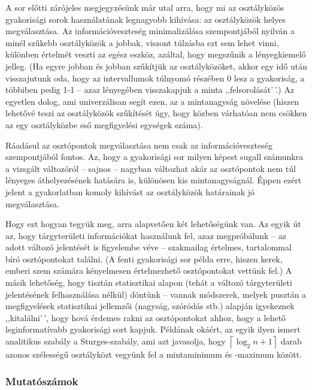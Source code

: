 \documentclass[
]{book}
\begin{document}
A sor előtti zárójeles megjegyzésünk már utal arra, hogy mi az osztályközös gyakorisági sorok használatának legnagyobb kihívása: az osztályközök helyes megválasztása. Az információveszteség minimalizálása szempontjából nyilván a minél szűkebb osztályközök a jobbak, viszont túlzásba ezt sem lehet vinni, különben értelmét veszti az egész eszköz, azáltal, hogy megszűnik a lényegkiemelő jelleg. (Ha egyre jobban és jobban szűkítjük az osztályközöket, akkor egy idő után visszajutunk oda, hogy az intervallumok túlnyomó részében 0 lesz a gyakoriság, a többiben pedig 1-1 -- azaz lényegében visszakapjuk a minta ,,felsorolását'\,'.) Az egyetlen dolog, ami univerzálisan segít ezen, az a mintanagyság növelése (hiszen lehetővé teszi az osztályközök szűkítését úgy, hogy közben várhatóan nem csökken az egy osztályközbe eső megfigyelési egységek száma).

Ráadásul az osztópontok megválasztása nem csak az információveszteség szempontjából fontos. Az, hogy a gyakorisági sor milyen képest sugall számunkra a vizsgált változóról -- sajnos -- nagyban változhat akár az osztópontok nem túl lényeges áthelyezésének hatására is, különösen kis mintanagyságnál. Éppen ezért jelent a gyakorlatban komoly kihívást az osztályközök határainak jó megválasztása.

Hogy ezt hogyan tegyük meg, arra alapvetően két lehetőségünk van. Az egyik út az, hogy tárgyterületi információkat használunk fel, azaz megpróbálunk -- az adott változó jelentését is figyelembe véve -- szakmailag értelmes, tartalommal bíró osztópontokat találni. (A fenti gyakorisági sor példa erre, hiszen kerek, emberi szem számára kényelmesen értelmezhető osztópontokat vettünk fel.) A másik lehetőség, hogy tisztán statisztikai alapon (tehát a változó tárgyterületi jelentésének felhasználása nélkül) döntünk -- vannak módszerek, melyek pusztán a megfigyelések statisztikai jellemzői (nagyság, szóródás stb.) alapján igyekeznek ,,kitalálni'\,', hogy hová érdemes rakni az osztópontokat ahhoz, hogy a lehető leginformatívabb gyakorisági sort kapjuk. Példának okáért, az egyik ilyen ismert analitikus szabály a Sturges-szabály, ami azt javasolja, hogy \(\left\lceil \log_2 n+1\right\rceil\) darab azonos szélességű osztályközt vegyünk fel a mintaminimum és -maximum között.

\hypertarget{deskriptivmennyegyvaltanalitikusmutatoszamok}{%
\subsubsection{Mutatószámok}\label{deskriptivmennyegyvaltanalitikusmutatoszamok}}
\end{document}
